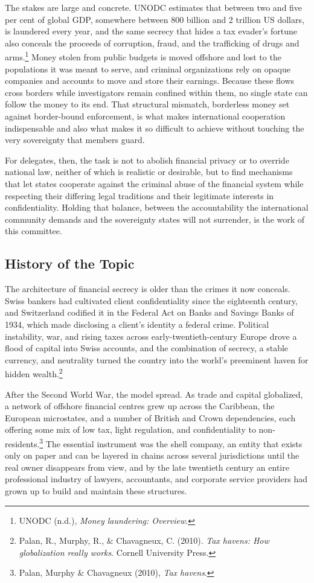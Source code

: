 The stakes are large and concrete. UNODC estimates that between two and five per cent of global GDP, somewhere between 800 billion and 2 trillion US dollars, is laundered every year, and the same secrecy that hides a tax evader’s fortune also conceals the proceeds of corruption, fraud, and the trafficking of drugs and arms.\footnote{UNODC (n.d.), \emph{Money laundering: Overview}.} Money stolen from public budgets is moved offshore and lost to the populations it was meant to serve, and criminal organizations rely on opaque companies and accounts to move and store their earnings. Because these flows cross borders while investigators remain confined within them, no single state can follow the money to its end. That structural mismatch, borderless money set against border-bound enforcement, is what makes international cooperation indispensable and also what makes it so difficult to achieve without touching the very sovereignty that members guard.

For delegates, then, the task is not to abolish financial privacy or to override national law, neither of which is realistic or desirable, but to find mechanisms that let states cooperate against the criminal abuse of the financial system while respecting their differing legal traditions and their legitimate interests in confidentiality. Holding that balance, between the accountability the international community demands and the sovereignty states will not surrender, is the work of this committee.

\subsection{History of the Topic}

The architecture of financial secrecy is older than the crimes it now conceals. Swiss bankers had cultivated client confidentiality since the eighteenth century, and Switzerland codified it in the Federal Act on Banks and Savings Banks of 1934, which made disclosing a client’s identity a federal crime. Political instability, war, and rising taxes across early-twentieth-century Europe drove a flood of capital into Swiss accounts, and the combination of secrecy, a stable currency, and neutrality turned the country into the world’s preeminent haven for hidden wealth.\footnote{Palan, R., Murphy, R., \& Chavagneux, C. (2010). \emph{Tax havens: How globalization really works}. Cornell University Press.}

After the Second World War, the model spread. As trade and capital globalized, a network of offshore financial centres grew up across the Caribbean, the European microstates, and a number of British and Crown dependencies, each offering some mix of low tax, light regulation, and confidentiality to non-residents.\footnote{Palan, Murphy \& Chavagneux (2010), \emph{Tax havens}.} The essential instrument was the shell company, an entity that exists only on paper and can be layered in chains across several jurisdictions until the real owner disappears from view, and by the late twentieth century an entire professional industry of lawyers, accountants, and corporate service providers had grown up to build and maintain these structures.


